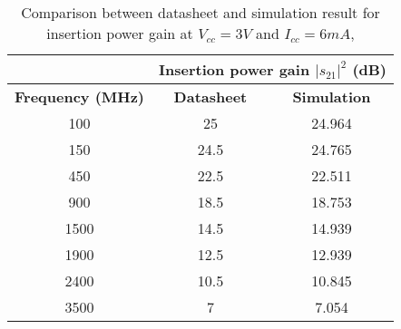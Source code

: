 \begin{table}[H]
\centering
\caption{Comparison between datasheet and simulation result for insertion power gain at  $V_{cc} = 3V$ and $I_{cc} = 6mA$,}
\label{table:1}
\begin{tabular}{|c|c|c|}
\hline
\textbf{}                & \multicolumn{2}{c|}{\textbf{Insertion power gain $|s_{21}|^2$ (dB)}} \\ \hline
\textbf{Frequency (MHz)} & \textbf{Datasheet}               & \textbf{Simulation}               \\ \hline
100                      & 25                               & 24.964                            \\ \hline
150                      & 24.5                             & 24.765                            \\ \hline
450                      & 22.5                             & 22.511                            \\ \hline
900                      & 18.5                             & 18.753                            \\ \hline
1500                     & 14.5                             & 14.939                            \\ \hline
1900                     & 12.5                             & 12.939                            \\ \hline
2400                     & 10.5                             & 10.845                            \\ \hline
3500                     & 7                                & 7.054                             \\ \hline
\end{tabular}
\end{table}